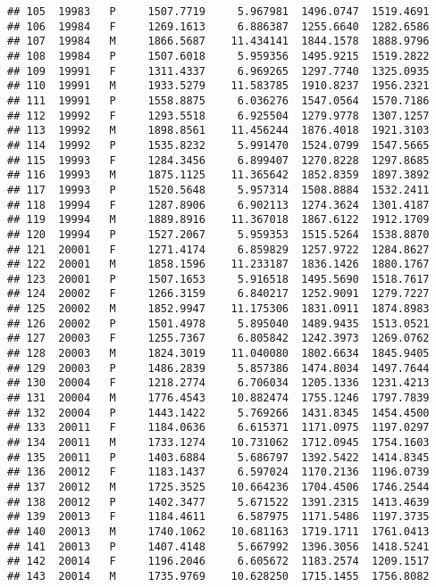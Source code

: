 \documentclass[]{article}
\begin{document}
\begin{verbatim}
## 105  19983   P     1507.7719     5.967981  1496.0747  1519.4691
## 106  19984   F     1269.1613     6.886387  1255.6640  1282.6586
## 107  19984   M     1866.5687    11.434141  1844.1578  1888.9796
## 108  19984   P     1507.6018     5.959356  1495.9215  1519.2822
## 109  19991   F     1311.4337     6.969265  1297.7740  1325.0935
## 110  19991   M     1933.5279    11.583785  1910.8237  1956.2321
## 111  19991   P     1558.8875     6.036276  1547.0564  1570.7186
## 112  19992   F     1293.5518     6.925504  1279.9778  1307.1257
## 113  19992   M     1898.8561    11.456244  1876.4018  1921.3103
## 114  19992   P     1535.8232     5.991470  1524.0799  1547.5665
## 115  19993   F     1284.3456     6.899407  1270.8228  1297.8685
## 116  19993   M     1875.1125    11.365642  1852.8359  1897.3892
## 117  19993   P     1520.5648     5.957314  1508.8884  1532.2411
## 118  19994   F     1287.8906     6.902113  1274.3624  1301.4187
## 119  19994   M     1889.8916    11.367018  1867.6122  1912.1709
## 120  19994   P     1527.2067     5.959353  1515.5264  1538.8870
## 121  20001   F     1271.4174     6.859829  1257.9722  1284.8627
## 122  20001   M     1858.1596    11.233187  1836.1426  1880.1767
## 123  20001   P     1507.1653     5.916518  1495.5690  1518.7617
## 124  20002   F     1266.3159     6.840217  1252.9091  1279.7227
## 125  20002   M     1852.9947    11.175306  1831.0911  1874.8983
## 126  20002   P     1501.4978     5.895040  1489.9435  1513.0521
## 127  20003   F     1255.7367     6.805842  1242.3973  1269.0762
## 128  20003   M     1824.3019    11.040080  1802.6634  1845.9405
## 129  20003   P     1486.2839     5.857386  1474.8034  1497.7644
## 130  20004   F     1218.2774     6.706034  1205.1336  1231.4213
## 131  20004   M     1776.4543    10.882474  1755.1246  1797.7839
## 132  20004   P     1443.1422     5.769266  1431.8345  1454.4500
## 133  20011   F     1184.0636     6.615371  1171.0975  1197.0297
## 134  20011   M     1733.1274    10.731062  1712.0945  1754.1603
## 135  20011   P     1403.6884     5.686797  1392.5422  1414.8345
## 136  20012   F     1183.1437     6.597024  1170.2136  1196.0739
## 137  20012   M     1725.3525    10.664236  1704.4506  1746.2544
## 138  20012   P     1402.3477     5.671522  1391.2315  1413.4639
## 139  20013   F     1184.4611     6.587975  1171.5486  1197.3735
## 140  20013   M     1740.1062    10.681163  1719.1711  1761.0413
## 141  20013   P     1407.4148     5.667992  1396.3056  1418.5241
## 142  20014   F     1196.2046     6.605672  1183.2574  1209.1517
## 143  20014   M     1735.9769    10.628250  1715.1455  1756.8082

\end{verbatim}
\end{document}
